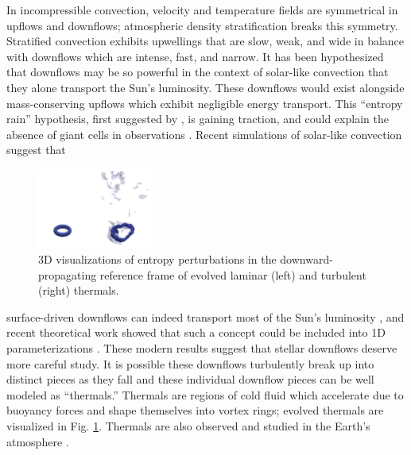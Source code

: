 \documentclass[11pt, preprint]{aastex}
\begin{document}
In incompressible convection, velocity and temperature fields are symmetrical in upflows and downflows; atmospheric density stratification breaks this symmetry.
Stratified convection exhibits upwellings that are slow, weak, and wide in balance with downflows which are intense, fast, and narrow.
It has been hypothesized that downflows may be so powerful in the context of solar-like convection that they alone transport the Sun's luminosity.
These downflows would exist alongside mass-conserving upflows which exhibit negligible energy transport.
This ``entropy rain'' hypothesis, first suggested by \citet{spruit1997}, is gaining traction, and could explain the absence of giant cells in observations \citep{hanasoge&all2015}.
Recent simulations of solar-like convection suggest that 
\begin{figure}
	\begin{center}
	\vspace{-30pt}
    \includegraphics[width=0.34\textwidth]{./figs/thermals_comparison.png}
	\vspace{-28pt}
	\end{center}
    \caption{
	3D visualizations of entropy perturbations in the downward-propagating reference frame of evolved laminar (left) and turbulent (right) thermals.
	\label{fig:thermals_comparison} }
	\vspace{-11pt}
\end{figure}
surface-driven downflows can indeed transport most of the Sun's luminosity \citep{kapyla&all2017}, and recent theoretical work showed that such a concept could be included into 1D parameterizations \citep{brandenburg2016}.
These modern results suggest that stellar downflows deserve more careful study.
It is possible these downflows turbulently break up into distinct pieces as they fall and these individual downflow pieces can be well modeled as ``thermals.''
Thermals are regions of cold fluid which accelerate due to buoyancy forces and shape themselves into vortex rings; evolved thermals are visualized in Fig. \ref{fig:thermals_comparison}.
Thermals are also observed and studied in the Earth's atmosphere \citep{lecoanet&jeevanjee2019}.
\end{document}
